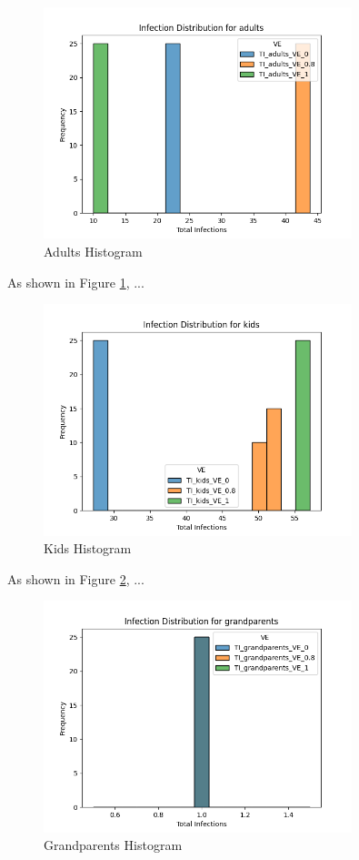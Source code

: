 \documentclass{article}
\begin{document}
\begin{figure}[htbp]
    \centering
    \includegraphics[width=0.8\textwidth]{adults}
    \caption{Adults Histogram}
    \label{fig:adults} %
\end{figure}

As shown in Figure \ref{fig:adults}, ...

\begin{figure}[htbp]
    \centering
    \includegraphics[width=0.8\textwidth]{kids}
    \caption{Kids Histogram}
    \label{fig:kids} 
\end{figure}

As shown in Figure \ref{fig:kids}, ...

\begin{figure}[htbp]
    \centering
    \includegraphics[width=0.8\textwidth]{grandparents}
    \caption{Grandparents Histogram}
    \label{fig:grandparents} 
\end{figure}
\end{document}
